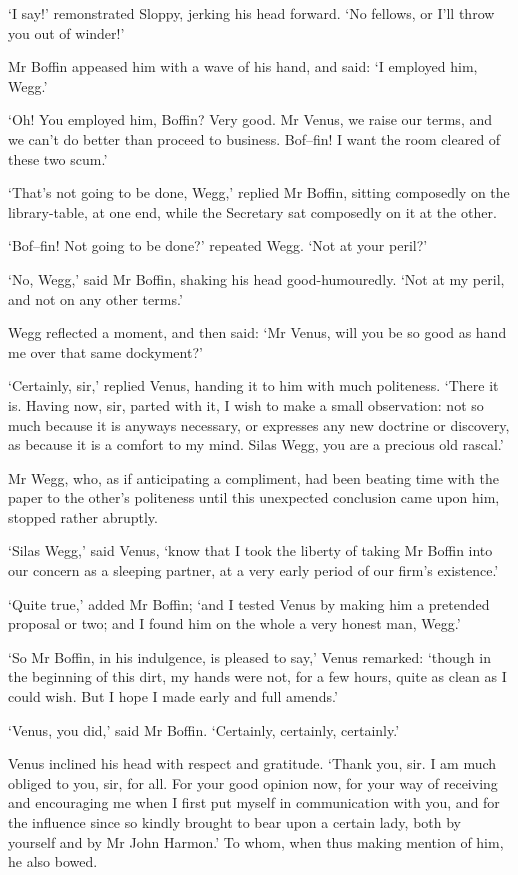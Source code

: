 ‘I say!’ remonstrated Sloppy, jerking his head forward. ‘No fellows, or
I’ll throw you out of winder!’

Mr Boffin appeased him with a wave of his hand, and said: ‘I employed
him, Wegg.’

‘Oh! You employed him, Boffin? Very good. Mr Venus, we raise our terms,
and we can’t do better than proceed to business. Bof--fin! I want the
room cleared of these two scum.’

‘That’s not going to be done, Wegg,’ replied Mr Boffin, sitting
composedly on the library-table, at one end, while the Secretary sat
composedly on it at the other.

‘Bof--fin! Not going to be done?’ repeated Wegg. ‘Not at your peril?’

‘No, Wegg,’ said Mr Boffin, shaking his head good-humouredly. ‘Not at my
peril, and not on any other terms.’

Wegg reflected a moment, and then said: ‘Mr Venus, will you be so good
as hand me over that same dockyment?’

‘Certainly, sir,’ replied Venus, handing it to him with much politeness.
‘There it is. Having now, sir, parted with it, I wish to make a small
observation: not so much because it is anyways necessary, or expresses
any new doctrine or discovery, as because it is a comfort to my mind.
Silas Wegg, you are a precious old rascal.’

Mr Wegg, who, as if anticipating a compliment, had been beating
time with the paper to the other’s politeness until this unexpected
conclusion came upon him, stopped rather abruptly.

‘Silas Wegg,’ said Venus, ‘know that I took the liberty of taking Mr
Boffin into our concern as a sleeping partner, at a very early period of
our firm’s existence.’

‘Quite true,’ added Mr Boffin; ‘and I tested Venus by making him a
pretended proposal or two; and I found him on the whole a very honest
man, Wegg.’

‘So Mr Boffin, in his indulgence, is pleased to say,’ Venus remarked:
‘though in the beginning of this dirt, my hands were not, for a few
hours, quite as clean as I could wish. But I hope I made early and full
amends.’

‘Venus, you did,’ said Mr Boffin. ‘Certainly, certainly, certainly.’

Venus inclined his head with respect and gratitude. ‘Thank you, sir.
I am much obliged to you, sir, for all. For your good opinion now, for
your way of receiving and encouraging me when I first put myself in
communication with you, and for the influence since so kindly brought
to bear upon a certain lady, both by yourself and by Mr John Harmon.’ To
whom, when thus making mention of him, he also bowed.

